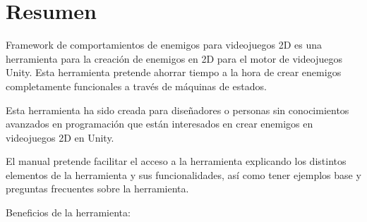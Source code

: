 \section{Resumen}
Framework de comportamientos de enemigos para videojuegos 2D es una herramienta para  la creación de enemigos en 2D para el motor de videojuegos Unity. Esta herramienta pretende ahorrar tiempo a la hora de crear enemigos completamente funcionales a través de máquinas de estados. 

Esta herramienta ha sido creada para diseñadores o personas sin conocimientos avanzados en programación que están interesados en crear enemigos en videojuegos 2D en Unity.

El manual pretende facilitar el acceso a la herramienta explicando los distintos elementos de la herramienta y sus funcionalidades, así como tener ejemplos base y  preguntas frecuentes sobre la herramienta. 

Beneficios de la herramienta: 
